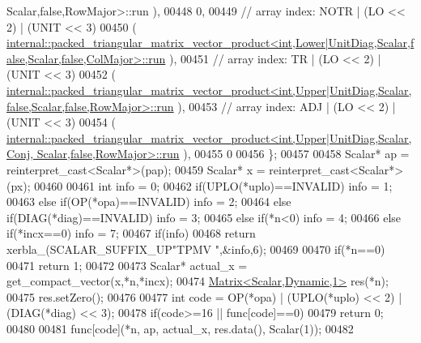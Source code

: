 \begin{DoxyCode}
{       Scalar,false,RowMajor>::run}
      ),
00448     0,
00449     \textcolor{comment}{// array index: NOTR  | (LO << 2) | (UNIT  << 3)}
00450     (
      \hyperlink{structinternal_1_1packed__triangular__matrix__vector__product}{
      internal::packed\_triangular\_matrix\_vector\_product<int,Lower|UnitDiag,Scalar,false,Scalar,false,ColMajor>::run}
      ),
00451     \textcolor{comment}{// array index: TR    | (LO << 2) | (UNIT  << 3)}
00452     (
      \hyperlink{structinternal_1_1packed__triangular__matrix__vector__product}{
      internal::packed\_triangular\_matrix\_vector\_product<int,Upper|UnitDiag,Scalar,false,Scalar,false,RowMajor>::run}
      ),
00453     \textcolor{comment}{// array index: ADJ   | (LO << 2) | (UNIT  << 3)}
00454     (
      \hyperlink{structinternal_1_1packed__triangular__matrix__vector__product}{internal::packed\_triangular\_matrix\_vector\_product<int,Upper|UnitDiag,Scalar,Conj,
       Scalar,false,RowMajor>::run}
      ),
00455     0
00456   \};
00457 
00458   Scalar* ap = \textcolor{keyword}{reinterpret\_cast<}Scalar*\textcolor{keyword}{>}(pap);
00459   Scalar* x = \textcolor{keyword}{reinterpret\_cast<}Scalar*\textcolor{keyword}{>}(px);
00460 
00461   \textcolor{keywordtype}{int} info = 0;
00462   \textcolor{keywordflow}{if}(UPLO(*uplo)==INVALID)                                            info = 1;
00463   \textcolor{keywordflow}{else} \textcolor{keywordflow}{if}(OP(*opa)==INVALID)                                          info = 2;
00464   \textcolor{keywordflow}{else} \textcolor{keywordflow}{if}(DIAG(*diag)==INVALID)                                       info = 3;
00465   \textcolor{keywordflow}{else} \textcolor{keywordflow}{if}(*n<0)                                                       info = 4;
00466   \textcolor{keywordflow}{else} \textcolor{keywordflow}{if}(*incx==0)                                                   info = 7;
00467   \textcolor{keywordflow}{if}(info)
00468     \textcolor{keywordflow}{return} xerbla\_(SCALAR\_SUFFIX\_UP\textcolor{stringliteral}{"TPMV "},&info,6);
00469 
00470   \textcolor{keywordflow}{if}(*n==0)
00471     \textcolor{keywordflow}{return} 1;
00472 
00473   Scalar* actual\_x = get\_compact\_vector(x,*n,*incx);
00474   \hyperlink{group___core___module}{Matrix<Scalar,Dynamic,1>} res(*n);
00475   res.setZero();
00476 
00477   \textcolor{keywordtype}{int} code = OP(*opa) | (UPLO(*uplo) << 2) | (DIAG(*diag) << 3);
00478   \textcolor{keywordflow}{if}(code>=16 || func[code]==0)
00479     \textcolor{keywordflow}{return} 0;
00480 
00481   func[code](*n, ap, actual\_x, res.data(), Scalar(1));
00482 

\end{DoxyCode}
